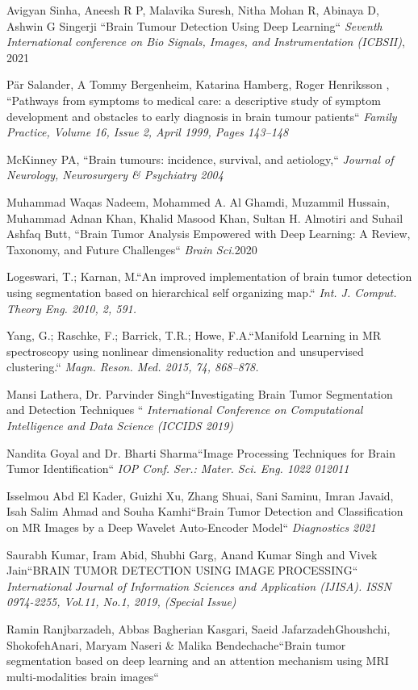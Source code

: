 Avigyan Sinha, Aneesh R P, Malavika Suresh, Nitha Mohan R, Abinaya D, Ashwin G Singerji ``Brain Tumour Detection Using Deep Learning`` \textit{Seventh International conference on Bio Signals, Images, and Instrumentation (ICBSII)}, 2021

Pär Salander, A Tommy Bergenheim, Katarina Hamberg, Roger Henriksson , ``Pathways from symptoms to medical care: a descriptive study of symptom development and obstacles to early diagnosis in brain tumour patients`` \textit{Family Practice, Volume 16, Issue 2, April 1999, Pages 143–148}

McKinney PA, ``Brain tumours: incidence, survival, and aetiology,`` \textit{Journal of Neurology, Neurosurgery \& Psychiatry 2004}

Muhammad Waqas Nadeem, Mohammed A. Al Ghamdi, Muzammil Hussain, Muhammad Adnan Khan, Khalid Masood Khan, Sultan H. Almotiri and Suhail Ashfaq Butt, ``Brain Tumor Analysis Empowered with Deep Learning: A Review, Taxonomy, and Future Challenges`` \textit{Brain Sci.}2020

Logeswari, T.; Karnan, M.``An improved implementation of brain tumor detection using segmentation based on hierarchical self organizing map.`` \textit{Int. J. Comput. Theory Eng. 2010, 2, 591.}

Yang, G.; Raschke, F.; Barrick, T.R.; Howe, F.A.``Manifold Learning in MR spectroscopy using nonlinear dimensionality reduction and unsupervised clustering.`` \textit{Magn. Reson. Med. 2015, 74, 868–878. }

Mansi Lathera, Dr. Parvinder Singh``Investigating Brain Tumor Segmentation and Detection Techniques `` \textit{International Conference on Computational Intelligence and Data Science (ICCIDS 2019)}

Nandita Goyal and Dr. Bharti Sharma``Image Processing Techniques for Brain Tumor Identification`` \textit{IOP Conf. Ser.: Mater. Sci. Eng. 1022 012011}

Isselmou Abd El Kader, Guizhi Xu, Zhang Shuai, Sani Saminu, Imran Javaid, Isah Salim Ahmad and Souha Kamhi``Brain Tumor Detection and Classification on MR Images by a Deep Wavelet Auto-Encoder Model`` \textit{Diagnostics 2021}

Saurabh Kumar, Iram Abid, Shubhi Garg, Anand Kumar Singh and Vivek Jain``BRAIN TUMOR DETECTION USING IMAGE PROCESSING`` \textit{International Journal of Information Sciences and Application (IJISA). ISSN 0974-2255, Vol.11, No.1, 2019, (Special Issue)}

Ramin Ranjbarzadeh, Abbas Bagherian Kasgari, Saeid JafarzadehGhoushchi, ShokofehAnari, Maryam Naseri \& Malika Bendechache``Brain tumor segmentation based on deep learning and an attention mechanism using MRI multi‑modalities brain images``